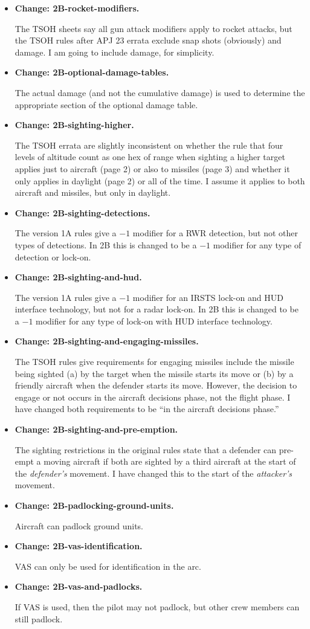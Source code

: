 \documentclass[10pt]{report}
\newcommand{\itemtag}[1]{\item \textbf{Change: #1.}\par}
\begin{document}
\begin{itemize}
    \itemtag{2B-rocket-modifiers} The TSOH sheets say all gun attack modifiers apply to rocket attacks, but the TSOH rules after APJ 23 errata exclude snap shots (obviously) and damage. I am going to include damage, for simplicity.
    
    \itemtag{2B-optional-damage-tables} The actual damage (and not the cumulative damage) is used to determine the appropriate section of the optional damage table.

    \itemtag{2B-sighting-higher} The TSOH errata are slightly inconsistent on whether the rule that four levels of altitude count as one hex of range when sighting a higher target applies just to aircraft (page 2) or also to missiles (page 3) and whether it only applies in daylight (page 2) or all of the time. I assume it applies to both aircraft and missiles, but only in daylight.
    
    \itemtag{2B-sighting-detections} The version 1A rules give a $-1$ modifier for a RWR detection, but not other types of detections. In 2B this is changed to be a $-1$ modifier for any type of detection or lock-on.
    
    \itemtag{2B-sighting-and-hud} The version 1A rules give a $-1$ modifier for an IRSTS lock-on and HUD interface technology, but not for a radar lock-on. In 2B this is changed to be a $-1$ modifier for any type of lock-on with HUD interface technology.

    \itemtag{2B-sighting-and-engaging-missiles} The TSOH rules give requirements for engaging missiles include the missile being sighted (a) by the target when the missile starts its move or (b) by a friendly aircraft when the defender starts its move. However, the decision to engage or not occurs in the aircraft decisions phase, not the flight phase. I have changed both requirements to be “in the aircraft decisions phase.”

    \itemtag{2B-sighting-and-pre-emption} The sighting restrictions in the original rules state that a defender can pre-empt a moving aircraft if both are sighted by a third aircraft at the start of the \emph{defender's} movement. I have changed this to the start of the \emph{attacker's} movement.

    \itemtag{2B-padlocking-ground-units} Aircraft can padlock ground units.

    \itemtag{2B-vas-identification} VAS can only be used for identification in the  arc.
    
    \itemtag{2B-vas-and-padlocks} If VAS is used, then the pilot may not padlock, but other crew members can still padlock.


\end{itemize}
\end{document}
